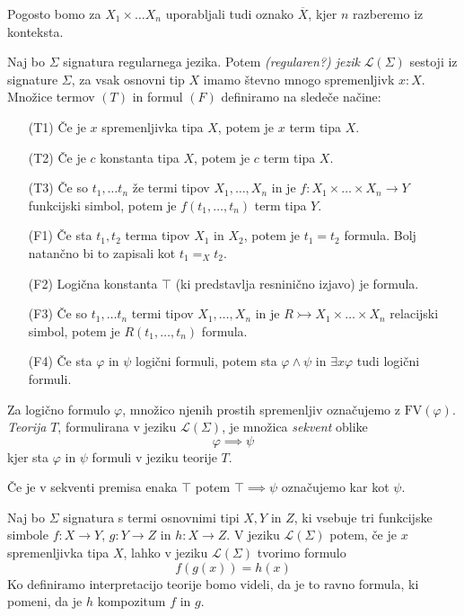 \documentclass[../kategoricna_logika.tex]{subfiles}
\begin{document}
Pogosto bomo za $X_1 \times \ldots X_n$ uporabljali tudi oznako $\overline{X}$, kjer $n$ razberemo iz konteksta.
\begin{definicija}
  Naj bo $\Sigma$ signatura regularnega jezika. Potem \emph{(regularen?) jezik} $\mathcal{L}(\Sigma)$ sestoji iz signature $\Sigma$, za vsak osnovni tip $X$ imamo števno mnogo spremenljivk $x:X$. Množice termov $(T)$ in formul $(F)$ definiramo na sledeče načine:
  \begin{itemize}
    \item [(T1)] Če je $x$ spremenljivka tipa $X$, potem je $x$ term tipa $X$.
    \item [(T2)] Če je $c$ konstanta tipa $X$, potem je $c$ term tipa $X$.
    \item [(T3)] Če so $t_1, \ldots t_n$ že termi tipov $X_1, \ldots, X_n$ in je $f : X_1 \times \ldots \times X_n \to Y$ funkcijski simbol, potem je $f(t_1, \ldots, t_n)$ term tipa $Y$.
    \item [(F1)] Če sta $t_1, t_2$ terma tipov $X_1$ in $X_2$, potem je $t_1 = t_2$ formula. Bolj natančno bi to zapisali kot $t_1 =_X t_2$.
    \item [(F2)] Logična konstanta $\top$ (ki predstavlja resninično izjavo) je formula.
    \item [(F3)] Če so $t_1, \ldots t_n$ termi tipov $X_1, \ldots, X_n$ in je $R \rightarrowtail X_1 \times \ldots \times X_n$ relacijski simbol, potem je $R(t_1, \ldots, t_n)$ formula.
    \item [(F4)] Če sta $\varphi$ in $\psi$ logični formuli, potem sta $\varphi \wedge \psi$ in $\exists x \varphi$ tudi logični formuli.
  \end{itemize}
  Za logično formulo $\varphi$, množico njenih prostih spremenljiv označujemo z $\mathrm{FV}(\varphi)$. \emph{Teorija} $T$, formulirana v jeziku $\mathcal{L}(\Sigma)$, je množica \emph{sekvent} oblike 
  $$\varphi \implies \psi$$
  kjer sta $\varphi$ in $\psi$ formuli v jeziku teorije $T$.
\end{definicija}
Če je v sekventi premisa enaka $\top$ potem $\top \implies \psi$ označujemo kar kot $\psi$.
\begin{primer}\label{primer:kompozitum}
  Naj bo $\Sigma$ signatura s termi osnovnimi tipi $X,Y$ in $Z$, ki vsebuje tri funkcijske simbole $f: X \to Y$, $g : Y \to Z$ in $h : X \to Z$. V jeziku $\mathcal{L}(\Sigma)$ potem, če je $x$ spremenljivka tipa $X$, lahko v jeziku $\mathcal{L}(\Sigma)$ tvorimo formulo
  $$f(g(x)) = h(x)$$
  Ko definiramo interpretacijo teorije bomo videli, da je to ravno formula, ki pomeni, da je $h$ kompozitum $f$ in $g$.
\end{primer}
\end{document}
